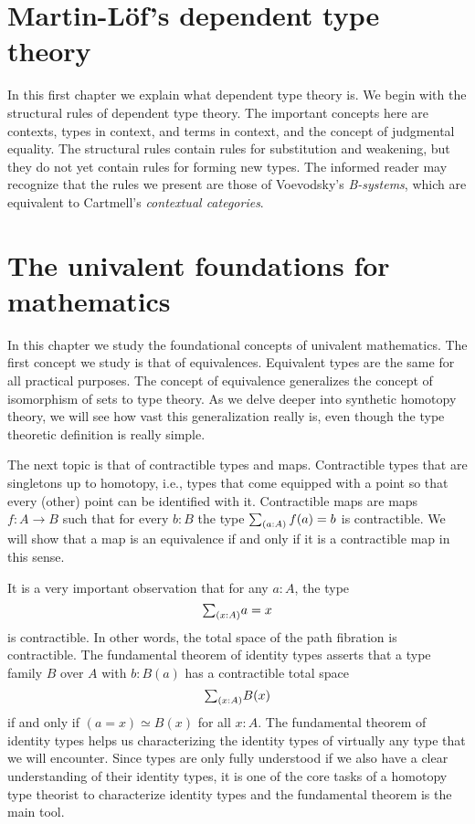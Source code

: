 \documentclass[10pt]{memoir}
\begin{document}
\mainmatter

\renewcommand{\thechapter}{\Roman{chapter}}

\chapter{Martin-L\"of's dependent type theory}

In this first chapter we explain what dependent type theory is. We begin with the structural rules of dependent type theory. The important concepts here are contexts, types in context, and terms in context, and the concept of judgmental equality. The structural rules contain rules for substitution and weakening, but they do not yet contain rules for forming new types. The informed reader may recognize that the rules we present are those of Voevodsky's \emph{B-systems}, which are equivalent to Cartmell's \emph{contextual categories}.







\chapter{The univalent foundations for mathematics}

In this chapter we study the foundational concepts of univalent mathematics.
The first concept we study is that of equivalences. Equivalent types are the same for all practical purposes. The concept of equivalence generalizes the concept of isomorphism of sets to type theory. As we delve deeper into synthetic homotopy theory, we will see how vast this generalization really is, even though the type theoretic definition is really simple.

The next topic is that of contractible types and maps. Contractible types that are singletons up to homotopy, i.e., types that come equipped with a point so that every (other) point can be identified with it. Contractible maps are maps $f:A\to B$ such that for every $b:B$ the type $\sm{a:A}f(a)=b$ is contractible. We will show that a map is an equivalence if and only if it is a contractible map in this sense.

It is a very important observation that for any $a:A$, the type
\begin{equation*}
  \sm{x:A}a=x  
\end{equation*}
is contractible. In other words, the total space of the path fibration is contractible. The fundamental theorem of identity types asserts that a type family $B$ over $A$ with $b:B(a)$ has a contractible total space
\begin{equation*}
  \sm{x:A}B(x)
\end{equation*}
if and only if $(a=x)\simeq B(x)$ for all $x:A$. The fundamental theorem of identity types helps us characterizing the identity types of virtually any type that we will encounter. Since types are only fully understood if we also have a clear understanding of their identity types, it is one of the core tasks of a homotopy type theorist to characterize identity types and the fundamental theorem is the main tool.
\end{document}
